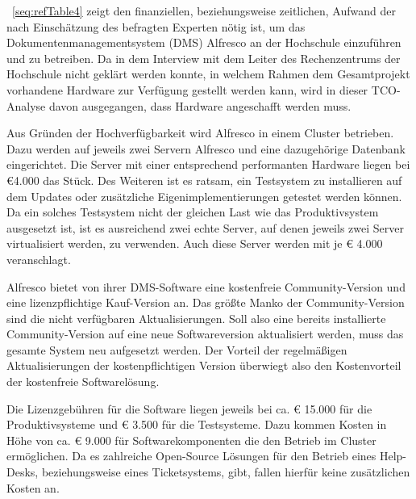 \documentclass[a4paper]{article}
\begin{document}
\bigskip

{\sffamily
\tablename~\ref{seq:refTable4} zeigt den finanziellen, beziehungsweise zeitlichen, Aufwand der nach Einschätzung des
befragten Experten nötig ist, um das Dokumentenmanagementsystem (DMS) Alfresco an der Hochschule einzuführen und zu
betreiben. Da in dem Interview mit dem Leiter des Rechenzentrums der Hochschule nicht geklärt werden konnte, in welchem
Rahmen dem Gesamtprojekt vorhandene Hardware zur Verfügung gestellt werden kann, wird in dieser TCO-Analyse davon
ausgegangen, dass Hardware angeschafft werden muss. }


\bigskip

{\sffamily
Aus Gründen der Hochverfügbarkeit wird Alfresco in einem Cluster betrieben. Dazu werden auf jeweils zwei Servern
Alfresco und eine dazugehörige Datenbank eingerichtet. Die Server mit einer entsprechend performanten Hardware liegen
bei €4.000 das Stück. Des Weiteren ist es ratsam, ein Testsystem zu installieren auf dem Updates oder zusätzliche
Eigenimplementierungen getestet werden können. Da ein solches Testsystem nicht der gleichen Last wie das
Produktivsystem ausgesetzt ist, ist es ausreichend zwei echte Server, auf denen jeweils zwei Server virtualisiert
werden, zu verwenden. Auch diese Server werden mit je € 4.000 veranschlagt.}


\bigskip

{\sffamily
Alfresco bietet von ihrer DMS-Software eine kostenfreie Community-Version und eine lizenzpflichtige Kauf-Version an. Das
größte Manko der Community-Version sind die nicht verfügbaren Aktualisierungen. Soll also eine bereits installierte
Community-Version auf eine neue Softwareversion aktualisiert werden, muss das gesamte System neu aufgesetzt werden. Der
Vorteil der regelmäßigen Aktualisierungen der kostenpflichtigen Version überwiegt also den Kostenvorteil der
kostenfreie Softwarelösung. }


\bigskip

{\sffamily
Die Lizenzgebühren für die Software liegen jeweils bei ca. € 15.000 für die Produktivsysteme und € 3.500 für die
Testsysteme. Dazu kommen Kosten in Höhe von ca. € 9.000 für Softwarekomponenten die den Betrieb im Cluster ermöglichen.
Da es zahlreiche Open-Source Lösungen für den Betrieb eines Help-Desks, beziehungsweise eines Ticketsystems, gibt,
fallen hierfür keine zusätzlichen Kosten an. }


\bigskip
\end{document}
